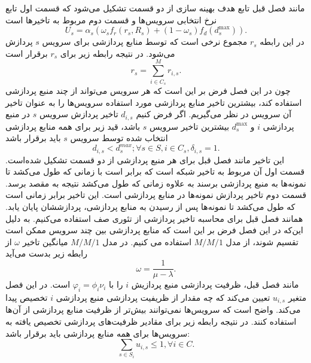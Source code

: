     مانند فصل قبل تابع هدف بهینه سازی از دو قسمت تشکیل می‌شود که قسمت اول تابع نرخ انتخابی سرویس‌ها و قسمت دوم مربوط به تاخیر‌ها است
    \begin{equation}
      U_s = \alpha_s \left ( \omega_s f_r(r_s, R_s) + (1-\omega_s) f_d(d_s^\text{max}) \right ) .
    \end{equation}
    در این رابطه $r_s$ مجموع نرخی است که توسط منابع پردازشی برای سرویس $s$ پردازش می‌شود.
    در نتیجه رابطه زیر برای $r_s$ برقرار است
    \begin{equation}
      r_s = \sum_{i \in C_s}^M r_{i,s} .
    \end{equation}
    چون در این فصل فرض بر این است که هر سرویس می‌تواند از چند منبع پردازشی استفاده کند، بیشترین تاخیر منابع پردازشی مورد استفاده سرویس‌ها را به عنوان تاخیر آن سرویس در نظر می‌گیریم.
    اگر فرض کنیم $d_{i,s}$ تاخیر پردازش سرویس $s$ در منبع پردازشی $i$ و $d_s^\text{max}$ بیشترین تاخیر سرویس $s$ باشد، قید زیر برای همه منابع پردازشی انتخاب شده توسط سرویس $s$ باید برقرار باشد
    \begin{equation}\label{eqn:max_delay}
      d_{i,s} < d_s^{max}; \forall s \in S, i \in C_s, \delta_{i,s} = 1.
    \end{equation}
    این تاخیر مانند فصل قبل برای هر منبع پردازشی از دو قسمت تشکیل شده‌است.
    قسمت اول آن مربوط به تاخیر شبکه است که برابر است با زمانی که طول می‌کشد تا نمونه‌ها به منبع پردازشی برسند به علاوه زمانی که طول می‌کشد نتیجه به مقصد برسد.
    قسمت دوم تاخیر پردازش نمونه‌ها در منابع پردازشی است.
    این تاخیر برابر زمانی است که طول می‌کشد تا نمونه‌ها پس از رسیدن به منابع پردازشی، پردازششان پایان یابد.
    همانند فصل قبل برای محاسبه تاخیر پردازشی از تئوری صف استفاده می‌کنیم.
    به دلیل این‌که در این فصل فرض بر این است که منابع پردازشی بین چند سرویس ممکن است تقسیم شوند، از مدل $M/M/1$ استفاده می کنیم.
    در مدل $M/M/1$ میانگین تاخیر $\omega$ از رابطه زیر بدست می‌آید\cite{basic_queueing_sztrik}
    \begin{equation}
      \omega = \frac{1}{\mu-\lambda}.
    \end{equation}
    مانند فصل قبل، ظرفیت پردازشی منبع پردازیش $i$ را با $\varphi_i = \phi_i \nu_i$ است.
    در این فصل متغیر $u_{i,s}$ تعیین می‌کند که چه مقدار از ظریفیت پردازشی منبع پردازشی $i$ تخصیص پیدا می‌کند.
    واضح است که سرویس‌ها نمی‌توانند بیش‌تر از ظرفیت منابع پردازشی از آن‌ها استفاده کنند.
    در نتیجه رابطه زیر برای مقادیر ظرفیت‌های پردازشی تخصیص یافته به سرویس‌ها برای همه منابع پردازشی باید برقرار باشد:
    \begin{equation}
      \sum_{s \in S_i} u_{i,s} \le 1, \forall i \in C.
    \end{equation}
